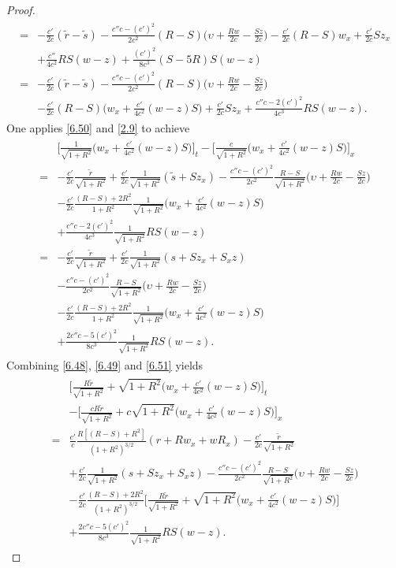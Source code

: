 \documentclass[10pt,a4paper]{amsart}
\newcommand{\fr}{\frac}
\begin{document}
\begin{proof}
\begin{align}
\begin{split}
=&-\fr{c'}{2c}(\tilde{r}-\tilde{s}) -\fr{c''c-(c')^2}{2c^2}(R-S)\Big(\upsilon+\fr{Rw}{2c}-\fr{Sz}{2c}\Big) -\fr{c'}{2c}(R-S)w_x +\fr{c'}{2c}Sz_x \\
&+\fr{c''}{4c^2}RS(w-z) +\fr{(c')^2}{8c^3}(S-5R)S(w-z)
\\
=&-\fr{c'}{2c}(\tilde{r}-\tilde{s}) -\fr{c''c-(c')^2}{2c^2}(R-S)\Big(\upsilon+\fr{Rw}{2c}-\fr{Sz}{2c}\Big) \\
&-\fr{c'}{2c}(R-S)\Big(w_x+\fr{c'}{4c^2}(w-z)S\Big) +\fr{c'}{2c}Sz_x+\fr{c''c-2(c')^2}{4c^3}RS(w-z).
\end{split}
\end{align}
One applies \eqref{6.50} and \eqref{2.9} to achieve
\begin{align}\label{6.51}
\begin{split}
&\Big[\fr{1}{\sqrt{1+R^2}}\Big(w_x+\fr{c'}{4c^2}(w-z)S\Big)\Big]_t -\Big[\fr{c}{\sqrt{1+R^2}}\Big(w_x+\fr{c'}{4c^2}(w-z)S\Big)\Big]_x \\
=&-\fr{c'}{2c}\fr{\tilde{r}}{\sqrt{1+R^2}} +\fr{c'}{2c}\fr{1}{\sqrt{1+R^2}}(\tilde{s}+Sz_x) -\fr{c''c-(c')^2}{2c^2}\fr{R-S}{\sqrt{1+R^2}}\Big(\upsilon+\fr{Rw}{2c}-\fr{Sz}{2c}\Big) \\ &-\fr{c'}{2c}\fr{(R-S)+2R^2}{1+R^2}\fr{1}{\sqrt{1+R^2}}\Big(w_x+\fr{c'}{4c^2}(w-z)S\Big) \\ &+\fr{c''c-2(c')^2}{4c^3}\fr{1}{\sqrt{1+R^2}}RS(w-z) \\
=&-\fr{c'}{2c}\fr{\tilde{r}}{\sqrt{1+R^2}} +\fr{c'}{2c}\fr{1}{\sqrt{1+R^2}}(s+Sz_x +S_xz) \\ &-\fr{c''c-(c')^2}{2c^2}\fr{R-S}{\sqrt{1+R^2}}\Big(\upsilon+\fr{Rw}{2c}-\fr{Sz}{2c}\Big) \\ &-\fr{c'}{2c}\fr{(R-S)+2R^2}{1+R^2}\fr{1}{\sqrt{1+R^2}}\Big(w_x+\fr{c'}{4c^2}(w-z)S\Big) \\ &+\fr{2c''c-5(c')^2}{8c^3}\fr{1}{\sqrt{1+R^2}}RS(w-z).
\end{split}
\end{align}
Combining \eqref{6.48}, \eqref{6.49} and \eqref{6.51} yields
\begin{align}\label{6.52}
\begin{split}
&\Big[\fr{R\tilde{r}}{\sqrt{1+R^2}} +\sqrt{1+R^2}\Big(w_x+\fr{c'}{4c^2}(w-z)S\Big)\Big]_t \\ &-\Big[\fr{cR\tilde{r}}{\sqrt{1+R^2}} +c\sqrt{1+R^2}\Big(w_x+\fr{c'}{4c^2}(w-z)S\Big)\Big]_x \\
=& \fr{c'}{c}\fr{R[(R-S)+R^2]}{(1+R^2)^{3/2}}(r+Rw_x+wR_x) -\fr{c'}{2c}\fr{\tilde{r}}{\sqrt{1+R^2}} \\ &+\fr{c'}{2c}\fr{1}{\sqrt{1+R^2}}(s+Sz_x +S_xz)-\fr{c''c-(c')^2}{2c^2}\fr{R-S}{\sqrt{1+R^2}}\Big(\upsilon+\fr{Rw}{2c}-\fr{Sz}{2c}\Big) \\ &-\fr{c'}{2c}\fr{(R-S)+2R^2}{(1+R^2)^{3/2}}\Big[\fr{R\tilde{r}}{\sqrt{1+R^2}} +\sqrt{1+R^2}\Big(w_x+\fr{c'}{4c^2}(w-z)S\Big)\Big] \\ &+\fr{2c''c-5(c')^2}{8c^3}\fr{1}{\sqrt{1+R^2}}RS(w-z).

\end{split}
\end{align}
\end{proof}
\end{document}
